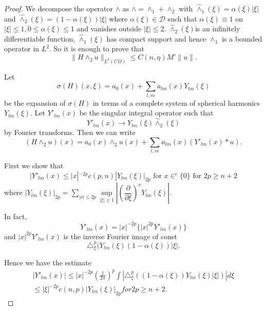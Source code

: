 \begin{proof}%
We decompose the operator $\wedge$ as $\wedge = \wedge_1 + \wedge_2$
with $\widehat{\wedge}_1 (\xi ) = \alpha (\xi ) | \xi |$ and $
\widehat{\wedge}_2 (\xi ) =(1- \alpha ( \xi )) | \xi | $ where $
\alpha ( \xi ) \in \mathscr{D}$ such that $\alpha ( \xi ) \equiv 1 $ on
$ | \xi | \leq 1, 0 \leq \alpha (\xi) \leq 1$ and vanishes outside $|\xi|
\leq 2$. $\widehat{\wedge}_2 (\xi)$\pageoriginale is an infinitely
differentiable function, $\widehat{\wedge}_1 (\xi)$ has compact
support and hence $\wedge_1$ is a bounded operator in $ L^2$. So it is
enough to prove that   
$$
\parallel H \wedge_2 u \parallel_{L^2 (C \Omega)} \leq C (n, \eta) M'
\parallel u \parallel. 
$$ 

Let 
\begin{equation}
\sigma (H) (x, \xi ) = a_0 (x) + \sum \limits _{l, m} a_{lm} (x)
Y_{lm} (\xi ) \tag{5.2} \label{chap3-eq5.2}
\end{equation}
be the expansion of $\sigma (H)$ in terms of a complete system of
spherical harmonics $Y_{lm} (\xi)$. Let $Y'_{lm}(x)$ be the
singular integral operator such that  
$$
Y'_{lm}(x) \to Y_{lm} (\xi) \widehat{\wedge}_2 (\xi) 
$$
by Fourier transforms. Then we can write 
\begin{equation}
(H \wedge_2 u) (x) = a_0(x) \wedge_2 u(x) + \sum\limits_{l, m}
  a_{lm}(x) (Y'_{lm}(x) * u). \tag{5.3} \label{chap4-eq5.3}
\end{equation}

First we show that 
\begin{equation}
|Y'_{lm}(x) \leq |x|^{-2p} c (p,n) | Y_{lm} (\xi ) |_{2p} \text{ for }
x \in ^c\{ 0 \} \text{ for } 2p \geq n+2 \tag{5.4}\label{chap3-eq5.4} 
\end{equation}
where $| Y_{lm} (\xi ) |_{2p} = \sum\limits_{| \nu | \leq 2p}
\sup\limits_{| \xi | \geq 1} | (\dfrac{\partial}{\partial \xi})^\nu
Y_{lm}( \xi ) |$.  

In fact, 
$$
Y'_{lm}(x) =  | x |^{-2p} \bigg\{ |x |^{2p} Y'_{lm} (x)\bigg\}
$$
and $| x|^{2p} Y'_{lm} (x)$ is the inverse Fourier image of const 
$$
\triangle^p_\xi (Y_{lm}(\xi) (1- \alpha (\xi)) | \xi |.
$$

 Hence we
have the estimate   
\begin{gather*}
|Y'_{lm}(x) | \leq | x|^{-2p} \left(\frac{1}{2\pi}\right)^p \int |
\triangle^p_\xi 
((1- \alpha (\xi )) Y_{lm} (\xi ) | \xi| ) | d \xi \\ 
\leq | \xi |^{-2p} c (n, p) | Y_{lm}(\xi ) |_{2p} for 2p \geq n + 2. 
\end{gather*}\pageoriginale 


\end{proof}
